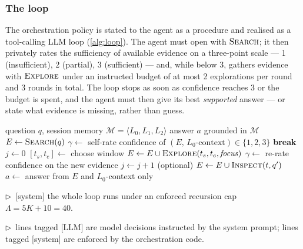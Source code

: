 \subsubsection{The loop}
\label{subsubsec:loop}

The orchestration policy is stated to the agent as a procedure and realised as a tool-calling LLM
loop (\cref{alg:loop}). The agent must open with $\textsc{Search}$; it then privately rates the
sufficiency of available evidence on a three-point scale --- 1 (insufficient), 2 (partial), 3
(sufficient) --- and, while below 3, gathers evidence with $\textsc{Explore}$ under an instructed
budget of at most 2 explorations per round and 3 rounds in total. The loop stops as soon as
confidence reaches 3 or the budget is spent, and the agent must then give its best \emph{supported}
answer --- or state what evidence is missing, rather than guess.

\begin{algorithm}[t]
\caption{Confidence-driven answering (one question).}
\label{alg:loop}
\begin{algorithmic}[1]
\Require question $q$, session memory $\mathcal{M} = \langle L_0, L_1, L_2 \rangle$
\Ensure answer $a$ grounded in $\mathcal{M}$
\State $E \gets \textsc{Search}(q)$ 
 
    \State $\gamma \gets$ self-rate confidence of $(E,\, L_0\text{-context}) \in \{1, 2, 3\}$ \Comment{[LLM]}
     \State \textbf{break} \EndIf
    \State $j \gets 0$
     
        \State $[t_s, t_e] \gets$ choose window 
        \State $E \gets E \cup \textsc{Explore}(t_s, t_e, \mathit{focus})$ 
        \State $\gamma \gets$ re-rate confidence on the new evidence \Comment{[LLM]}
        \State $j \gets j + 1$
    \EndWhile
    \State (optional) $E \gets E \cup \textsc{Inspect}(t, q')$ 
\EndFor
\State $a \gets$ answer from $E$ and $L_0$-context only 
\end{algorithmic}
\vspace{3pt}
{\footnotesize
$\triangleright$~[system] the whole loop runs under an enforced recursion cap $\Lambda = 5K+10 = 40$.\par
$\triangleright$~lines tagged [LLM] are model decisions instructed by the system prompt;
lines tagged [system] are enforced by the orchestration code.\par}
\end{algorithm}

